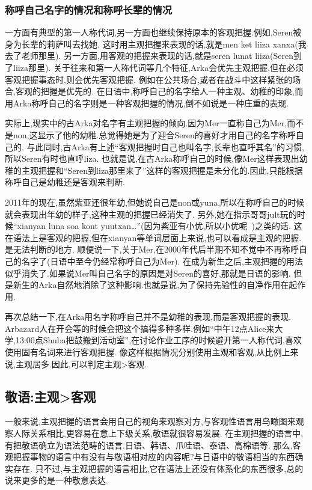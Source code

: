 \subsubsection{称呼自己名字的情况和称呼长辈的情况}

一方面有典型的第一人称代词,另一方面也继续保持原本的客观把握.例如,Seren被身为长辈的莉萨叫去找她.
这时用主观把握来表现的话,就是men ket liiza xanxa(我去了老师那里).
另一方面,用客观的把握来表现的话,就是seren lunat liiza(Seren到了liiza那里).
关于往来和第一人称代词等几个特征,Arka会优先主观把握,但在必须客观把握事态时,则会优先客观把握.
例如在公共场合,或者在战斗中这样紧张的场合,客观的把握是优先的.
在日语中,称呼自己的名字给人一种主观、幼稚的印象,而用Arka称呼自己的名字则是一种客观把握的情况,倒不如说是一种庄重的表现.

实际上,现实中的古Arka对名字有主观把握的倾向.因为Mer一直称自己为Mer,而不是non,这显示了他的幼稚.总觉得她是为了迎合Seren的喜好才用自己的名字称呼自己的.
与此同时,古Arka有上述“客观把握时自己也叫名字,长辈也直呼其名”的习惯,所以Seren有时也直呼liza.
也就是说,在古Arka称呼自己的时候,像Mer这样表现出幼稚的主观把握和“Seren到liza那里来了”这样的客观把握是未分化的.因此,只能根据称呼自己是幼稚还是客观来判断.

2011年的现在,虽然紫亚还很年幼,但她说自己是non或yuna,所以在称呼自己的时候就会表现出年幼的样子,这种主观的把握已经消失了.
另外,她在指示哥哥jult玩的时候``xianyan luna soa kont yuutxan…''(因为紫亚有小优,所以小优呢~)之类的话.
这在语法上是客观的把握,但在xianyan等单词层面上来说,也可以看成是主观的把握.是无法判断的地方.
顺便说一下,关于Mer,在2000年代后半期不知不觉中不再称呼自己的名字了(日语中至今仍经常称呼自己为Mer).
在成为新生之后,主观把握的用法似乎消失了.如果说Mer叫自己名字的原因是对Seren的喜好,那就是日语的影响.
但是新生的Arka自然地消除了这种影响.也就是说,为了保持先验性的自净作用在起作用.

再次总结一下,在Arka用名字称呼自己并不是幼稚的表现,而是客观把握的表现.
Arbazard人在开会等的时候会把这个搞得多种多样.例如“中午12点Alice来大学,13:00点Shuba把鼓搬到活动室”,在讨论作业工序的时候避开第一人称代词,喜欢使用固有名词来进行客观把握.
像这样根据情况分别使用主观和客观,从比例上来说,主观居多.因此,可以判定主观>客观.

\subsection{敬语:主观>客观}

一般来说,主观把握的语言会用自己的视角来观察对方,与客观性语言用鸟瞰图来观察人际关系相比,更容易在意上下级关系,敬语就很容易发展.
在主观把握的语言中,有把敬语确立为语法范畴的语言.日语、韩语、爪哇语、泰语、高棉语等.
那么,客观把握事物的语言中有没有与敬语相对应的内容呢?与日语中的敬语相当的东西确实存在.
只不过,与主观把握的语言相比,它在语法上还没有体系化的东西很多,总的说来更多的是一种敬意表达.

